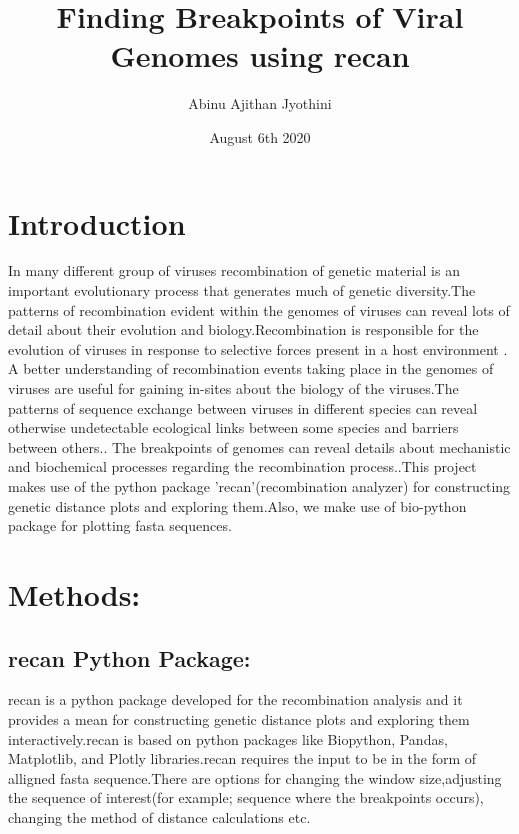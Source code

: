 \documentclass{article}
\title{Finding Breakpoints of Viral Genomes using recan}
\author{Abinu Ajithan Jyothini}
\date{August 6th 2020}
\begin{document}
\maketitle
\section{Introduction}
In many different group of viruses recombination of genetic material is an important evolutionary process that generates much of genetic diversity.The patterns of recombination evident within the genomes of viruses can reveal lots of detail about their evolution and biology.Recombination is responsible for the evolution of viruses in response to selective forces present in a host environment \cite{perez2015recombination}. A better understanding of recombination events taking place in the genomes of viruses are useful for gaining in-sites about the biology of the viruses.The patterns of sequence exchange between viruses in different species can reveal otherwise undetectable ecological links between some species and barriers between others.\cite{martin2015rdp4}. The breakpoints of genomes can reveal details about mechanistic and biochemical processes regarding the recombination process.\cite{martin2015rdp4}.This project makes use of the python package 'recan'\cite{babin2020recan}(recombination analyzer) for constructing genetic distance plots and exploring them.Also, we make use of bio-python\cite{chapman2000biopython} package for plotting fasta sequences.
\section{Methods:}
\subsection{recan Python Package:}
recan is a python package developed for the recombination analysis and it provides a mean for constructing genetic distance plots and exploring them interactively.recan is based on python packages like Biopython, Pandas, Matplotlib, and Plotly libraries.recan requires the input to be in the form of alligned fasta sequence.There are options for changing the window size,adjusting the sequence of interest(for example; sequence where the breakpoints occurs), changing the method of distance calculations etc.
\end{document}
